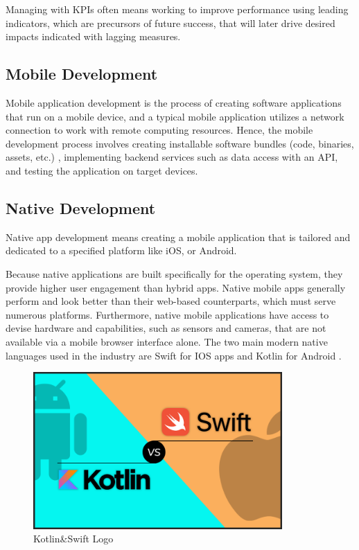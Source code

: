 Managing with KPIs often means working to improve performance using leading indicators, which are precursors of future success, that will later drive desired impacts indicated with lagging measures.
\subsection{Mobile Development}
Mobile application development is the process of creating software applications that run on a mobile device, and a typical mobile application utilizes a network connection to work with remote computing resources. Hence, the mobile development process involves creating installable software bundles (code, binaries, assets, etc.) , implementing backend services such as data access with an API, and testing the application on target devices.
\subsection*{Native Development}
Native app development means creating a mobile application that is tailored and dedicated to a specified platform like iOS, or Android. 

Because native applications are built specifically for the operating system, they provide higher user engagement than hybrid apps. Native mobile apps generally perform and look better than their web-based counterparts, which must serve numerous platforms. Furthermore, native mobile applications have access to devise hardware and capabilities, such as sensors and cameras, that are not available via a mobile browser interface alone.
The two main modern native languages used in the industry are Swift for IOS apps and Kotlin for Android .
\begin{figure}[H]
    \centering
    \includegraphics[height=6cm]{images/chap1/kotlin_swift.png}
    \caption{Kotlin\&Swift Logo}
    \label{fig:enter-label}
\end{figure}
